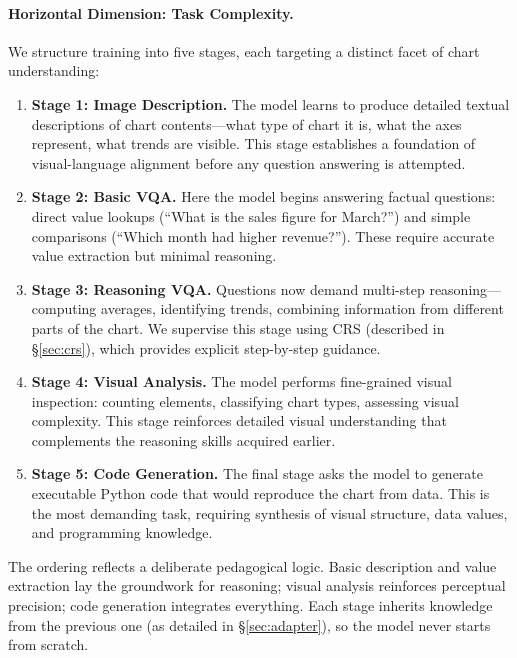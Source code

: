 ﻿\documentclass[journal]{IEEEtran}
\newcommand{\crs}{CRS}
\begin{document}
\paragraph{Horizontal Dimension: Task Complexity.}
We structure training into five stages, each targeting a distinct facet of chart understanding:
\begin{enumerate}
    \item \textbf{Stage 1: Image Description.} The model learns to produce detailed textual descriptions of chart contents---what type of chart it is, what the axes represent, what trends are visible. This stage establishes a foundation of visual-language alignment before any question answering is attempted.
    \item \textbf{Stage 2: Basic VQA.} Here the model begins answering factual questions: direct value lookups (``What is the sales figure for March?'') and simple comparisons (``Which month had higher revenue?''). These require accurate value extraction but minimal reasoning.
    \item \textbf{Stage 3: Reasoning VQA.} Questions now demand multi-step reasoning---computing averages, identifying trends, combining information from different parts of the chart. We supervise this stage using \crs{} (described in \S\ref{sec:crs}), which provides explicit step-by-step guidance.
    \item \textbf{Stage 4: Visual Analysis.} The model performs fine-grained visual inspection: counting elements, classifying chart types, assessing visual complexity. This stage reinforces detailed visual understanding that complements the reasoning skills acquired earlier.
    \item \textbf{Stage 5: Code Generation.} The final stage asks the model to generate executable Python code that would reproduce the chart from data. This is the most demanding task, requiring synthesis of visual structure, data values, and programming knowledge.
\end{enumerate}
The ordering reflects a deliberate pedagogical logic. Basic description and value extraction lay the groundwork for reasoning; visual analysis reinforces perceptual precision; code generation integrates everything. Each stage inherits knowledge from the previous one (as detailed in \S\ref{sec:adapter}), so the model never starts from scratch.
\end{document}
